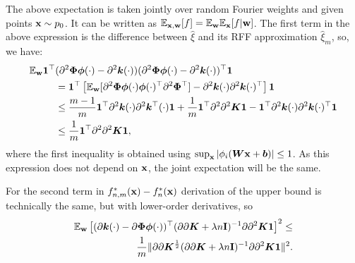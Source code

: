 The above expectation is taken jointly over random Fourier weights and given points
${\bf x} \sim p_0$.
It can be written as
$\mathbb{E}_{{\bf x}, {\bf w}}[f] = \mathbb{E}_{{\bf w}}\mathbb{E}_{{\bf x}}[f | {\bf w}]$.
The first term in the above expression is the difference between $\hat{\xi}$
and its RFF approximation $\hat{\xi}_m$, so, we have:
\begin{align*}
    \mathbb{E}_{{\bf w}}{\bf 1}^{\top}&(\partial^2\bm{\Phi}{\bm \phi}(\cdot) - \partial^2{\bm k}(\cdot))(\partial^2\bm{\Phi}{\bm \phi}(\cdot) - \partial^2{\bm k}(\cdot))^{\top}{\bf 1} \\
    &= {\bf 1}^{\top}\left[\mathbb{E}_{{\bf w}}[\partial^2\bm{\Phi}{\bm \phi}(\cdot){\bm \phi}(\cdot)^{\top}\partial^2\bm{\Phi}^{\top}] - \partial^2{\bm k}(\cdot)\partial^2{\bm k}(\cdot)^{\top}\right]{\bf 1}\\
    &\leq \frac{m - 1}{m}{\bf 1}^{\top}\partial^2{\bm k}(\cdot)\partial^2{\bm k}^{\top}(\cdot){\bf 1} + \frac{1}{m}{\bf 1}^{\top}\partial^2\partial^2{\bm K}{\bf 1} - {\bf 1}^{\top}\partial^2{\bm k}(\cdot)\partial^2{\bm k}(\cdot)^{\top}{\bf 1}\\
    &\leq \frac{1}{m}{\bf 1}^{\top}\partial^2\partial^2{\bm K}{\bf 1},
\end{align*}
where the first inequality is obtained using
$\sup_{\bf x}|\phi_i({\bm W}{\bf x} + {\bm b})| \leq 1$.
As this expression does not depend on ${\bf x}$, the joint expectation will be the same.

For the second term in $f_{n, m}^*({\bf x}) - f_n^*({\bf x})$ derivation of the
upper bound is technically the same, but with lower-order derivatives, so
\begin{align*}
    \mathbb{E}_{{\bf w}}\left[(\partial{\bm k}(\cdot) -
    \partial\bm{\Phi}{\bm \phi}(\cdot))^{\top}(\partial\partial {\bm K} +
    \lambda n{\bf I})^{-1}\partial\partial^2 {\bm K}{\bf 1}\right]^2 \leq \\
    \frac{1}{m}\|\partial\partial {\bm K}^{\frac{1}{2}}(\partial\partial {\bm K} + \lambda n{\bf I})^{-1}\partial\partial^2 {\bm K}{\bf 1}\|^2.
\end{align*}

